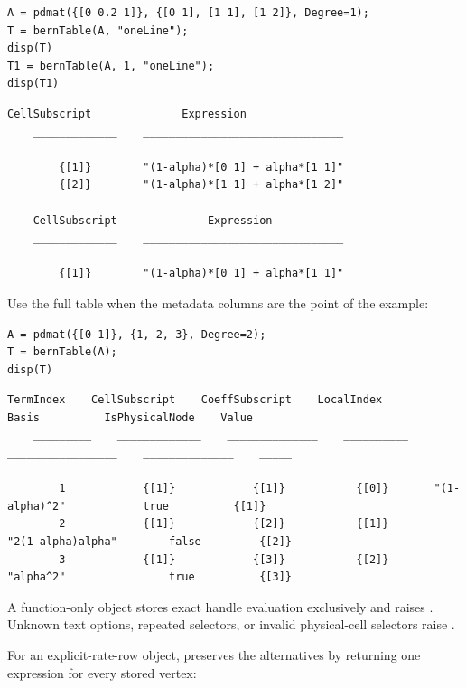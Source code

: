 \examplehead
\begin{lstlisting}[style=dpmatlab]
A = pdmat({[0 0.2 1]}, {[0 1], [1 1], [1 2]}, Degree=1);
T = bernTable(A, "oneLine");
disp(T)
T1 = bernTable(A, 1, "oneLine");
disp(T1)
\end{lstlisting}

\begin{lstlisting}[style=dpoutput]
    CellSubscript              Expression
    _____________    _______________________________

        {[1]}        "(1-alpha)*[0 1] + alpha*[1 1]"
        {[2]}        "(1-alpha)*[1 1] + alpha*[1 2]"

    CellSubscript              Expression
    _____________    _______________________________

        {[1]}        "(1-alpha)*[0 1] + alpha*[1 1]"
\end{lstlisting}

Use the full table when the metadata columns are the point of the example:

\begin{lstlisting}[style=dpmatlab]
A = pdmat({[0 1]}, {1, 2, 3}, Degree=2);
T = bernTable(A);
disp(T)
\end{lstlisting}

\begin{lstlisting}[style=dpwideoutput]
    TermIndex    CellSubscript    CoeffSubscript    LocalIndex          Basis          IsPhysicalNode    Value
    _________    _____________    ______________    __________    _________________    ______________    _____

        1            {[1]}            {[1]}           {[0]}       "(1-alpha)^2"            true          {[1]}
        2            {[1]}            {[2]}           {[1]}       "2(1-alpha)alpha"        false         {[2]}
        3            {[1]}            {[3]}           {[2]}       "alpha^2"                true          {[3]}
\end{lstlisting}

\remarkshead
A function-only object stores exact handle evaluation exclusively and raises \allowbreak{}. Unknown text options, repeated selectors, or invalid physical-cell selectors raise \allowbreak{}.

For an explicit-rate-row object,  preserves the alternatives by returning one expression for every stored vertex:

